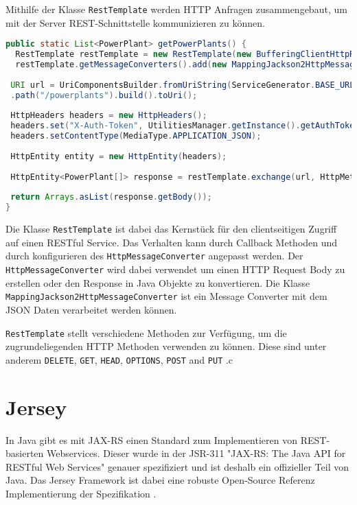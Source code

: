 Mithilfe der Klasse \texttt{RestTemplate} werden HTTP Anfragen zusammengebaut, um mit der Server REST-Schnittstelle kommunizieren zu können.

\begin{lstlisting}[language=java, caption={Anfrage um alle Kraftwerke zu erhalten},label={lst:getAllPowerPlants}, escapechar=|]
public static List<PowerPlant> getPowerPlants() {
  RestTemplate restTemplate = new RestTemplate(new BufferingClientHttpRequestFactory(new SimpleClientHttpRequestFactory()));
  restTemplate.getMessageConverters().add(new MappingJackson2HttpMessageConverter());
 
 URI url = UriComponentsBuilder.fromUriString(ServiceGenerator.BASE_URL)
 .path("/powerplants").build().toUri();
 
 HttpHeaders headers = new HttpHeaders();
 headers.set("X-Auth-Token", UtilitiesManager.getInstance().getAuthToken().getToken());
 headers.setContentType(MediaType.APPLICATION_JSON);
 
 HttpEntity entity = new HttpEntity(headers);
 
 HttpEntity<PowerPlant[]> response = restTemplate.exchange(url, HttpMethod.GET, entity, PowerPlant[].class);
 
 return Arrays.asList(response.getBody());
}

\end{lstlisting}

Die Klasse \texttt{RestTemplate} ist dabei das Kernstück für den clientseitigen Zugriff auf einen RESTful Service. Das Verhalten kann durch Callback Methoden und durch konfigurieren des \texttt{HttpMessageConverter} angepasst werden. Der \texttt{HttpMessageConverter} wird dabei verwendet um einen HTTP Request Body zu erstellen oder den Response in Java Objekte zu konvertieren. Die Klasse \texttt{MappingJackson2HttpMessageConverter} ist ein Message Converter mit dem JSON Daten verarbeitet werden können.

\texttt{RestTemplate} stellt verschiedene Methoden zur Verfügung, um die zugrundeliegenden HTTP Methoden verwenden zu können. Diese sind unter anderem \texttt{DELETE}, \texttt{GET}, \texttt{HEAD}, \texttt{OPTIONS}, \texttt{POST} and \texttt{PUT} \cite{springDokuRestTemplate}.c


\section{Jersey}
In Java gibt es mit JAX-RS einen Standard zum Implementieren von REST-basierten Webservices. Dieser wurde in der JSR-311 "JAX-RS: The Java API for RESTful Web Services" \cite{jsr311} genauer spezifiziert und ist deshalb ein offizieller Teil von Java. Das Jersey Framework ist dabei eine robuste Open-Source Referenz Implementierung der Spezifikation \cite{restfulWS:Kubert}.


